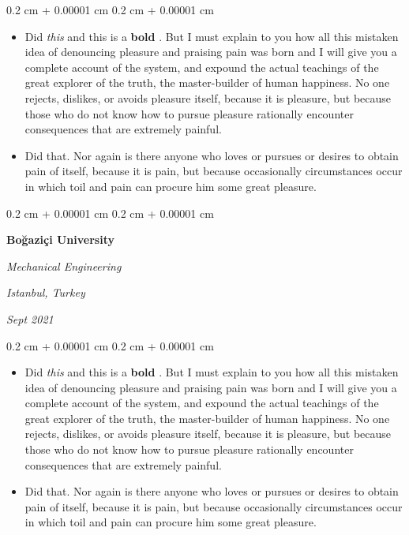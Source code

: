 \documentclass[10pt, letterpaper]{article}
\newenvironment{highlights}{
    \begin{itemize}[
        topsep=0.10 cm,
        parsep=0.10 cm,
        partopsep=0pt,
        itemsep=0pt,
        leftmargin=0.4 cm + 10pt
    ]
}{
    \end{itemize}
} %
\newenvironment{onecolentry}{
    \begin{adjustwidth}{
        0.2 cm + 0.00001 cm
    }{
        0.2 cm + 0.00001 cm
    }
}{
    \end{adjustwidth}
} %
\newenvironment{twocolentry}[2][]{
    \onecolentry
    \def\secondColumn{#2}
    \setcolumnwidth{\fill, 4.5 cm}
    \begin{paracol}{2}
}{
    \switchcolumn \raggedleft \secondColumn
    \end{paracol}
    \endonecolentry
} %
\let\hrefWithoutArrow\href
\renewcommand{\href}[2]{\hrefWithoutArrow{#1}{\ifthenelse{\equal{#2}{}}{ }{#2 }\raisebox{.15ex}{\footnotesize \faExternalLink*}}}
\begin{document}
        \vspace{0.10 cm}
        \begin{onecolentry}
            \begin{highlights}
                \item Did \textit{this} and this is a \textbf{bold} \href{https://example.com}{link}. But I must explain to you how all this mistaken idea of denouncing pleasure and praising pain was born and I will give you a complete account of the system, and expound the actual teachings of the great explorer of the truth, the master-builder of human happiness. No one rejects, dislikes, or avoids pleasure itself, because it is pleasure, but because those who do not know how to pursue pleasure rationally encounter consequences that are extremely painful.
                \item Did that. Nor again is there anyone who loves or pursues or desires to obtain pain of itself, because it is pain, but because occasionally circumstances occur in which toil and pain can procure him some great pleasure.
            \end{highlights}
        \end{onecolentry}


        \vspace{0.2 cm}

        \begin{twocolentry}{
        \textit{Istanbul, Turkey}    
            
        \textit{Sept 2021}}
            \textbf{Boğaziçi University}

            \textit{Mechanical Engineering}
        \end{twocolentry}

        \vspace{0.10 cm}
        \begin{onecolentry}
            \begin{highlights}
                \item Did \textit{this} and this is a \textbf{bold} \href{https://example.com}{link}. But I must explain to you how all this mistaken idea of denouncing pleasure and praising pain was born and I will give you a complete account of the system, and expound the actual teachings of the great explorer of the truth, the master-builder of human happiness. No one rejects, dislikes, or avoids pleasure itself, because it is pleasure, but because those who do not know how to pursue pleasure rationally encounter consequences that are extremely painful.
                \item Did that. Nor again is there anyone who loves or pursues or desires to obtain pain of itself, because it is pain, but because occasionally circumstances occur in which toil and pain can procure him some great pleasure.
            \end{highlights}
        \end{onecolentry}
\end{document}
